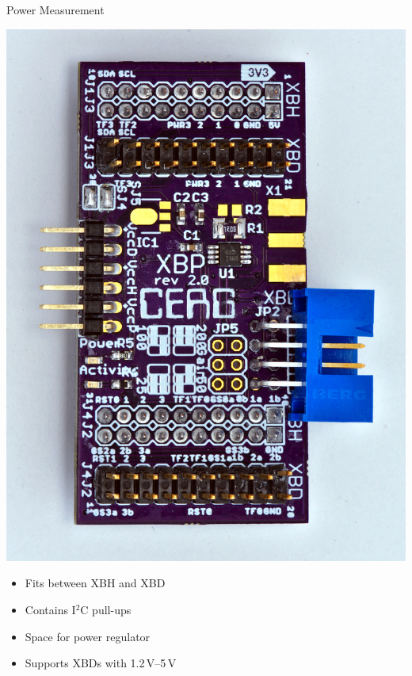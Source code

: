 \documentclass[xcolor=pdftex,dvipsnames,table,final]{beamer}
\begin{document}
\begin{frame}[fragile]{}
\begin{columns}[t, totalwidth=\textwidth]
\begin{column}{.675\linewidth}
\begin{columns}
\begin{column}{.473\linewidth}
       \begin{block}{Power Measurement}
        \begin{minipage}{0.45\linewidth}
		\includegraphics[scale=1.2]{../figures/xbp-full-top90}
        \end{minipage}%
	\begin{minipage}{0.48\linewidth}
          \begin{itemize}
            \item Fits between XBH and XBD
            \item Contains I$^2$C pull-ups
            \item Space for power regulator
            \item Supports XBDs with 1.2\,V--5\,V
          \end{itemize}

\end{minipage}
\end{block}
\end{column}
\end{columns}
\end{column}
\end{columns}
\end{frame}
\end{document}
